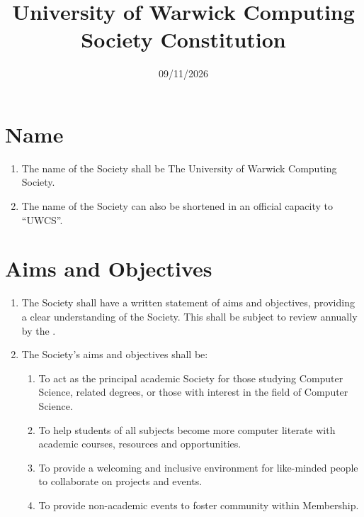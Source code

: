 \documentclass[a4paper,11pt,parskip=half-]{scrartcl} %
\title{University of Warwick Computing Society Constitution}
\date{09/11/2026}
\begin{document}
\maketitle[Provisional As Of]

\vspace{1cm}
\section{Name}
\begin{enumerate}
    \item The name of the Society shall be The University of Warwick Computing Society.
    \item The name of the Society can also be shortened in an official capacity to ``UWCS''.
\end{enumerate}

\section{Aims and Objectives}
    \begin{enumerate}
        \item The Society shall have a written statement of aims and objectives, providing a clear understanding of the Society. This shall be subject to review annually by the \exec.

        \item The Society's aims and objectives shall be:
            \begin{enumerate}
                \item To act as the principal academic Society for those studying Computer Science, related degrees, or those with interest in the field of Computer Science.

                \item To help students of all subjects become more computer literate with academic courses, resources and opportunities.

                \item To provide a welcoming and inclusive environment for like-minded people to collaborate on projects and events.

                \item To provide non-academic events to foster community within Membership.
            \end{enumerate}
    \end{enumerate}
\end{document}
